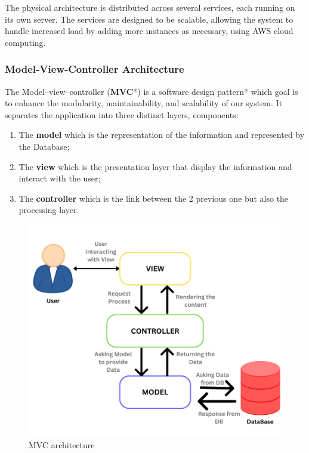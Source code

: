 \documentclass[12pt,a4paper,table,english]{article}
\begin{document}
	The physical architecture is distributed across several services, each running on its own server. The services are designed to be scalable, allowing the system to handle increased load by adding more instances as necessary, using AWS cloud computing.
	
	\subsubsection{Model-View-Controller Architecture}
	
	The Model–view–controller (\textbf{MVC}*) is a software design pattern* which goal is to enhance the modularity, maintainability, and scalability of our system. It separates the application into three distinct layers, components:
	
	\begin{enumerate}
		\item The \textbf{model} which is the representation of the information and represented by the Database;
		\item The \textbf{view} which is the presentation layer that display the information and interact with the user;
		\item The \textbf{controller} which is the link between the 2 previous one but also the processing layer.
	\end{enumerate}
	
	\begin{figure}[H]
		\centering
		\includegraphics[width=150mm]{Image/mvc}
		\caption{MVC architecture}
		\label{fig:MVC architecture}
	\end{figure}
	
\end{document}
